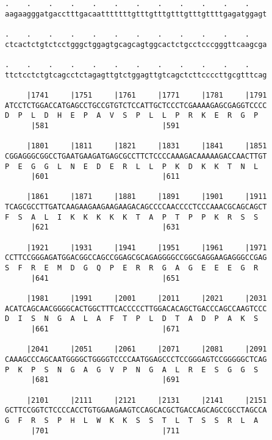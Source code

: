 \documentclass{article}
\begin{document}
\begin{Verbatim}
.    .    .    .    .    .    .    .    .    .    .    .    
aagaagggatgacctttgacaatttttttgtttgtttgtttgtttgttttgagatggagt
                                                            
.    .    .    .    .    .    .    .    .    .    .    .    
ctcactctgtctcctgggctggagtgcagcagtggcactctgcctcccgggttcaagcga
                                                            
.    .    .    .    .    .    .    .    .    .    .    .    
ttctcctctgtcagcctctagagttgtctggagttgtcagctcttccccttgcgtttcag
                                                            
     |1741     |1751     |1761     |1771     |1781     |1791
ATCCTCTGGACCATGAGCCTGCCGTGTCTCCATTGCTCCCTCGAAAAGAGCGAGGTCCCC
D  P  L  D  H  E  P  A  V  S  P  L  L  P  R  K  E  R  G  P  
      |581                          |591                    
  
     |1801     |1811     |1821     |1831     |1841     |1851
CGGAGGGCGGCCTGAATGAAGATGAGCGCCTTCTCCCCAAAGACAAAAAGACCAACTTGT
P  E  G  G  L  N  E  D  E  R  L  L  P  K  D  K  K  T  N  L  
      |601                          |611                    
  
     |1861     |1871     |1881     |1891     |1901     |1911
TCAGCGCCTTGATCAAGAAGAAGAAGAAGACAGCCCCAACCCCTCCCAAACGCAGCAGCT
F  S  A  L  I  K  K  K  K  K  T  A  P  T  P  P  K  R  S  S  
      |621                          |631                    
  
     |1921     |1931     |1941     |1951     |1961     |1971
CCTTCCGGGAGATGGACGGCCAGCCGGAGCGCAGAGGGGCCGGCGAGGAAGAGGGCCGAG
S  F  R  E  M  D  G  Q  P  E  R  R  G  A  G  E  E  E  G  R  
      |641                          |651                    
  
     |1981     |1991     |2001     |2011     |2021     |2031
ACATCAGCAACGGGGCACTGGCTTTCACCCCCTTGGACACAGCTGACCCAGCCAAGTCCC
D  I  S  N  G  A  L  A  F  T  P  L  D  T  A  D  P  A  K  S  
      |661                          |671                    
  
     |2041     |2051     |2061     |2071     |2081     |2091
CAAAGCCCAGCAATGGGGCTGGGGTCCCCAATGGAGCCCTCCGGGAGTCCGGGGGCTCAG
P  K  P  S  N  G  A  G  V  P  N  G  A  L  R  E  S  G  G  S  
      |681                          |691                    
  
     |2101     |2111     |2121     |2131     |2141     |2151
GCTTCCGGTCTCCCCACCTGTGGAAGAAGTCCAGCACGCTGACCAGCAGCCGCCTAGCCA
G  F  R  S  P  H  L  W  K  K  S  S  T  L  T  S  S  R  L  A  
      |701                          |711                    
  

\end{Verbatim}
\end{document}
